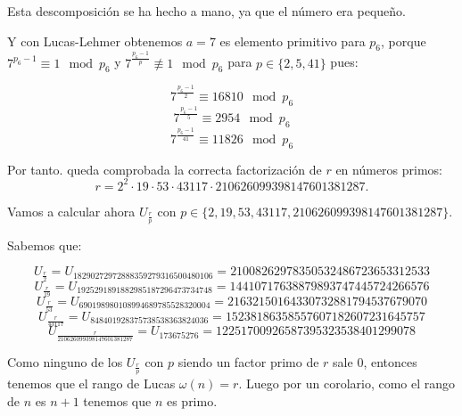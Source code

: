\documentclass[a4paper]{article}
\begin{document}
Esta descomposición se ha hecho a mano, ya que el número era pequeño.

Y con Lucas-Lehmer obtenemos $a=7$ es elemento primitivo para $p_6$, porque $7^{p_6-1}\equiv 1\mod p_6$ y $7^{\frac{p_6-1}{p}}\not\equiv 1\mod p_6 $ para $p\in\{2, 5, 41\}$ pues:

$$7^{\frac{p_6-1}{2}}\equiv 16810 \mod p_6$$
$$7^{\frac{p_6-1}{5}}\equiv 2954 \mod p_6$$
$$7^{\frac{p_6-1}{41}}\equiv 11826 \mod p_6$$

Por tanto. queda comprobada la correcta factorización de $r$ en números primos:
$$r=2^2\cdot 19\cdot 53\cdot 43117\cdot 210626099398147601381287.$$

Vamos a calcular ahora $U_{\frac{r}{p}}$ con $p\in\{2,19,53,43117,210626099398147601381287\}$.

Sabemos que:

$$U_{\frac{r}{2}} = U_{18290272972888359279316500480106}=21008262978350532486723653312533$$
$$U_{\frac{r}{19}} = U_{1925291891882985187296473734748}=14410717638879893747445724266576$$
$$U_{\frac{r}{53}} = U_{690198980108994689785528320004}=21632150164330732881794537679070$$
$$U_{\frac{r}{43117}} = U_{848401928375738538363824036}=15238186358557607182607231645757$$
$$U_{\frac{r}{210626099398147601381287}} = U_{173675276}=12251700926587395323538401299078$$

Como ninguno de los $U_{\frac{r}{p}}$ con $p$ siendo un factor primo de $r$ sale 0, entonces tenemos que el rango de Lucas $\omega (n)=r$. Luego por un corolario, como el rango de $n$ es $n+1$ tenemos que $n$ es primo.
\end{document}
